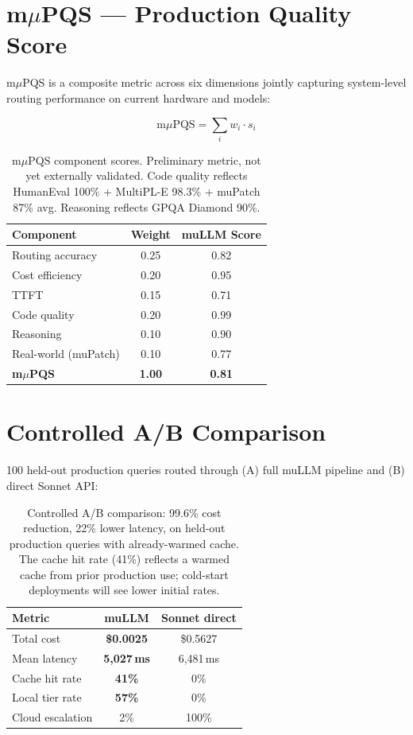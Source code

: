 \documentclass[11pt]{article}
\begin{document}
\section{m$\mu$PQS --- Production Quality Score}

m$\mu$PQS is a composite metric across six dimensions jointly capturing
system-level routing performance on current hardware and models:

\[
\text{m}\mu\text{PQS} = \sum_i w_i \cdot s_i
\]

\begin{table}[h]
\centering
\small
\begin{tabular}{lcc}
\toprule
\textbf{Component} & \textbf{Weight} & \textbf{muLLM Score} \\
\midrule
Routing accuracy & 0.25 & 0.82 \\
Cost efficiency & 0.20 & 0.95 \\
TTFT & 0.15 & 0.71 \\
Code quality & 0.20 & 0.99 \\
Reasoning & 0.10 & 0.90 \\
Real-world (muPatch) & 0.10 & 0.77 \\
\midrule
\textbf{m$\mu$PQS} & \textbf{1.00} & \textbf{0.81} \\
\bottomrule
\end{tabular}
\caption{m$\mu$PQS component scores. Preliminary metric, not yet
externally validated. Code quality reflects HumanEval 100\% +
MultiPL-E 98.3\% + muPatch 87\% avg. Reasoning reflects GPQA
Diamond 90\%.}
\label{tab:mpqs}
\end{table}

\section{Controlled A/B Comparison}

100 held-out production queries routed through (A) full muLLM pipeline
and (B) direct Sonnet API:

\begin{table}[h]
\centering
\small
\begin{tabular}{lcc}
\toprule
\textbf{Metric} & \textbf{muLLM} & \textbf{Sonnet direct} \\
\midrule
Total cost & \textbf{\$0.0025} & \$0.5627 \\
Mean latency & \textbf{5,027\,ms} & 6,481\,ms \\
Cache hit rate & \textbf{41\%} & 0\% \\
Local tier rate & \textbf{57\%} & 0\% \\
Cloud escalation & 2\% & 100\% \\
\bottomrule
\end{tabular}
\caption{Controlled A/B comparison: 99.6\% cost reduction, 22\% lower
latency, on held-out production queries with already-warmed cache. The
cache hit rate (41\%) reflects a warmed cache from prior production
use; cold-start deployments will see lower initial rates.}
\label{tab:ab}
\end{table}
\end{document}
